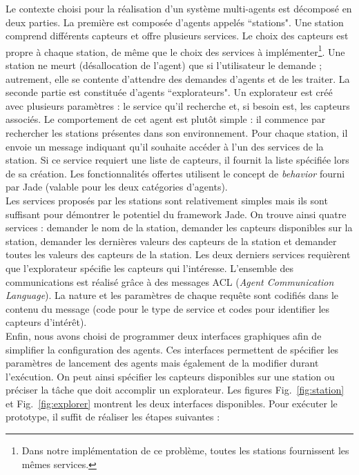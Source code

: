 \documentclass[conference]{IEEEtran}
\begin{document}
Le contexte choisi pour la réalisation d'un système multi-agents est décomposé en deux parties. La première est composée d'agents appelés ``stations". Une station comprend différents capteurs et offre plusieurs services. Le choix des capteurs est propre à chaque station, de même que le choix des services à implémenter\footnote{Dans notre implémentation de ce problème, toutes les stations fournissent les mêmes services.}. Une station ne meurt (désallocation de l'agent) que si l'utilisateur le demande ; autrement, elle se contente d'attendre des demandes d'agents et de les traiter. La seconde partie est constituée d'agents ``explorateurs". Un explorateur est créé avec plusieurs paramètres : le service qu'il recherche et, si besoin est, les capteurs associés. Le comportement de cet agent est plutôt simple : il commence par rechercher les stations présentes dans son environnement. Pour chaque station, il envoie un message indiquant qu'il souhaite accéder à l'un des services de la station. Si ce service requiert une liste de capteurs, il fournit la liste spécifiée lors de sa création. Les fonctionnalités offertes utilisent le concept de \textit{behavior} fourni par Jade (valable pour les deux catégories d'agents).\\

Les services proposés par les stations sont relativement simples mais ils sont suffisant pour démontrer le potentiel du framework Jade. On trouve ainsi quatre services : demander le nom de la station, demander les capteurs disponibles sur la station, demander les dernières valeurs des capteurs de la station et demander toutes les valeurs des capteurs de la station. Les deux derniers services requièrent que l'explorateur spécifie les capteurs qui l'intéresse. L'ensemble des communications est réalisé grâce à des messages ACL (\textit{Agent Communication Language}). La nature et les paramètres de chaque requête sont codifiés dans le contenu du message (code pour le type de service et codes pour identifier les capteurs d'intérêt).\\

Enfin, nous avons choisi de programmer deux interfaces graphiques afin de simplifier la configuration des agents. Ces interfaces permettent de spécifier les paramètres de lancement des agents mais également de la modifier durant l'exécution. On peut ainsi spécifier les capteurs disponibles sur une station ou préciser la tâche que doit accomplir un explorateur. Les figures Fig.~\ref{fig:station} et Fig.~\ref{fig:explorer} montrent les deux interfaces disponibles. Pour exécuter le prototype, il suffit de réaliser les étapes suivantes :\\
\end{document}
